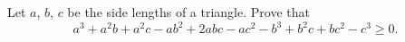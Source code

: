 Let $a$, $b$, $c$ be the side lengths of a triangle. Prove that
\[a^3+a^2b+a^2c-ab^2+2abc-ac^2-b^3+b^2c+bc^2-c^3\ge0 .\]
